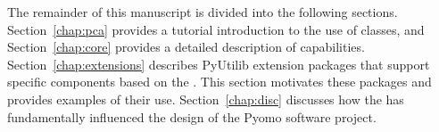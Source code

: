 \fi


The remainder of this manuscript is divided into the following sections.
Section~\ref{chap:pca} provides a tutorial introduction to the use of \pcasp classes,
and Section~\ref{chap:core} provides a detailed description of \pcasp capabilities.
Section~\ref{chap:extensions} describes PyUtilib extension
packages that support specific components based on the \pca.  This section
motivates these packages and provides examples of their use.  Section~\ref{chap:disc}
discusses how the \pcasp has 
fundamentally influenced the design of the Pyomo software project.



